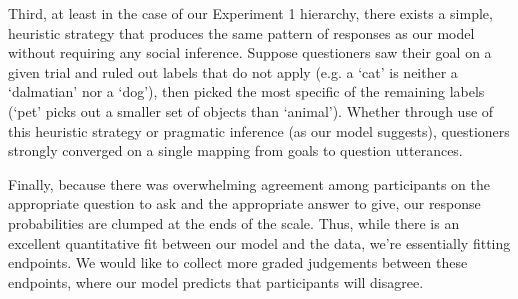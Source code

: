 \documentclass[12pt, floatsintext, jou]{apa6}
\begin{document}
Third, at least in the case of our Experiment 1 hierarchy, there exists a simple, heuristic strategy that produces the same pattern of responses as our model without requiring any social inference. Suppose questioners saw their goal on a given trial and ruled out labels that do not apply (e.g. a `cat' is neither a `dalmatian' nor a `dog'), then picked the most specific of the remaining labels (`pet' picks out a smaller set of objects than `animal'). Whether through use of this heuristic strategy or pragmatic inference (as our model suggests), questioners strongly converged on a single mapping from goals to question utterances. 

Finally, because there was overwhelming agreement among participants on the appropriate question to ask and the appropriate answer to give, our response probabilities are clumped at the ends of the scale. Thus, while there is an excellent quantitative fit between our model and the data, we're essentially fitting endpoints. We would like to collect more graded judgements between these endpoints, where our model predicts that participants will disagree.
 
\end{document}
